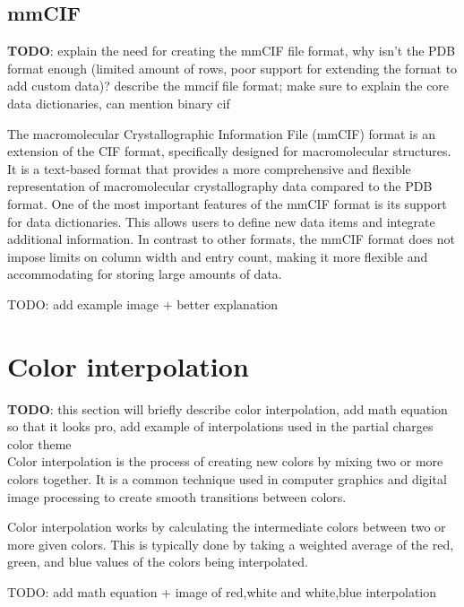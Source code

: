 \documentclass[
  digital,     %
  oneside,     %
  nosansbold,  %
  nocolorbold, %
  lof,         %
  lot,         %
]{fithesis4}
\begin{document}
\subsection{mmCIF}
\label{subsection:mmcif}

\textbf{TODO}: explain the need for creating the mmCIF file format, why isn't the PDB format enough (limited amount of rows, poor support for extending the format to add custom data)? describe the mmcif file format; make sure to explain the core data dictionaries, can mention binary cif \\

\cite{gu2009structural}

The macromolecular Crystallographic Information File (mmCIF) format is an extension of the CIF format, specifically designed for macromolecular structures.
It is a text-based format that provides a more comprehensive and flexible representation of macromolecular crystallography data compared to the PDB format.
One of the most important features of the mmCIF format is its support for data dictionaries.
This allows users to define new data items and integrate additional information.
In contrast to other formats, the mmCIF format does not impose limits on column width and entry count, making it more flexible and accommodating for storing large amounts of data.

TODO: add example image + better explanation

\section{Color interpolation}
\label{section:color_interpolation}

\textbf{TODO}: this section will briefly describe color interpolation, add math equation so that it looks pro, add example of interpolations used in the partial charges color theme \\

Color interpolation is the process of creating new colors by mixing two or more colors together. It is a common technique used in computer graphics and digital image processing to create smooth transitions between colors.

Color interpolation works by calculating the intermediate colors between two or more given colors. This is typically done by taking a weighted average of the red, green, and blue values of the colors being interpolated.

TODO: add math equation + image of red,white and white,blue interpolation
\end{document}
